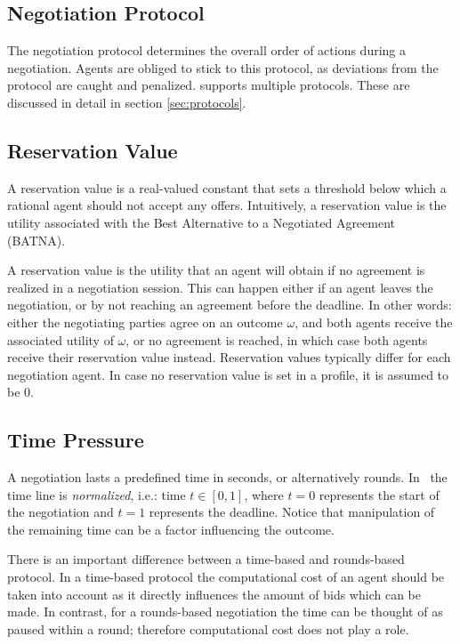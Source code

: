 \documentclass[]{article}
\begin{document}
\subsection{Negotiation Protocol}
The negotiation protocol determines the overall order of actions during a negotiation. Agents are obliged to stick to this protocol, as deviations from the protocol are caught and penalized. \Genius supports multiple protocols. These are discussed in detail in section \ref{sec:protocols}.

 
\subsection{Reservation Value}
A reservation value is a real-valued constant that sets a threshold below which a rational agent should not accept any offers. Intuitively, a reservation value is the utility associated with the Best Alternative to a Negotiated Agreement (BATNA).

A reservation value is the utility that an agent will obtain if no agreement is realized in a negotiation session. This can happen either if an agent leaves the negotiation, or by not reaching an agreement before the deadline. In other words: either the negotiating parties agree on an outcome $\omega$, and both agents receive the associated utility of $\omega$, or no agreement is reached, in which case both agents receive their reservation value instead. Reservation values typically differ for each negotiation agent. In case no reservation value is set in a profile, it is assumed to be 0.


\subsection{Time Pressure}
A negotiation lasts a predefined time in seconds, or alternatively rounds. In \Genius~the time line is \emph{normalized}, i.e.: time $t \in [0, 1]$, where $t = 0$ represents the start of the negotiation and $t = 1$ represents the deadline. Notice that manipulation of the remaining time can be a factor influencing the outcome.

There is an important difference between a time-based and rounds-based protocol. In a time-based protocol the computational cost of an agent should be taken into account as it directly influences the amount of bids which can be made. In contrast, for a rounds-based negotiation the time can be thought of as paused within a round; therefore computational cost does not play a role.
\end{document}
